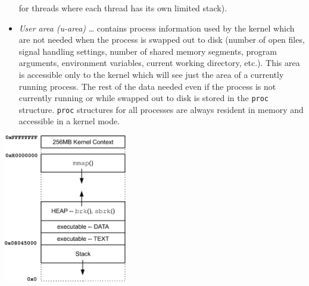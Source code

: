 \begin{itemize}
for threads where each thread has its own limited stack).
\item \emph{User area (u-area)} \dots{} contains process information used by
the kernel which are not needed when the process is swapped out to disk
(number of open files, signal handling settings, number of shared memory segments,
program arguments, environment variables, current working directory, etc.).
This area is accessible only to the kernel which will see just the area 
of a currently running process. The rest of the data needed even if the process
is not currently running or while swapped out to disk is stored in the
\texttt{proc} structure.  \texttt{proc} structures for all processes are always
resident in memory and accessible in a kernel mode.
\end{itemize}

\begin{slide}
\begin{center}
\includegraphics[width=54mm]{img/eps/x86-memory-proc-mem-layout.eps}  
\end{center}
\end{slide}

\label{SOLARIS_PROC_ADDR_SPACE}

